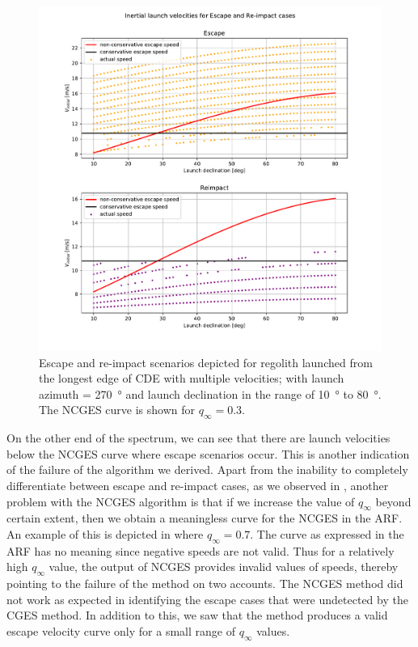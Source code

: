 \begin{figure}[htb]
\centering
\captionsetup{justification=centering}
\includegraphics[width=\textwidth, height=0.5\textheight, keepaspectratio=true]{non_conservative_escape_speed/qinfinity_dot3_escape_reimpact_multipleVelocities_corrected.pdf}
\caption{Escape and re-impact scenarios depicted for regolith launched from the longest edge of \gls{CDE} with multiple velocities; with launch azimuth = \SI{270}{\degree} and launch declination in the range of \SI{10}{\degree} to \SI{80}{\degree}. The \gls{NCGES} curve is shown for $q_\infty = 0.3$.}
\label{fig:non_conservative_multiple_velocities_qinfinity_0.3}
\end{figure}
\FloatBarrier
On the other end of the spectrum, we can see that there are launch velocities below the \gls{NCGES} curve where escape scenarios occur. This is another indication of the failure of the algorithm we derived.
%
\newline\newline
%
Apart from the inability to completely differentiate between escape and re-impact cases, as we observed in , another problem with the \gls{NCGES} algorithm is that if we increase the value of $q_\infty$ beyond certain extent, then we obtain a meaningless curve for the \gls{NCGES} in the \gls{ARF}. An example of this is depicted in  where $q_\infty = 0.7$. The curve as expressed in the \gls{ARF} has no meaning since negative speeds are not valid. Thus for a relatively high $q_\infty$ value, the output of \gls{NCGES} provides invalid values of speeds, thereby pointing to the failure of the method on two accounts. The \gls{NCGES} method did not work as expected in identifying the escape cases that were undetected by the \gls{CGES} method. In addition to this, we saw that the method produces a valid escape velocity curve only for a small range of $q_\infty$ values.
